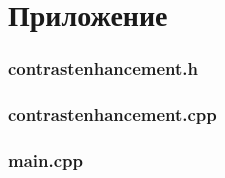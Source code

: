 \section*{Приложение}\label{prog}

\vspace{5mm}

\subsubsection*{contrast\textunderscore enhancement.h}


\vspace{1cm}

\subsubsection*{contrast\textunderscore enhancement.cpp}


\vspace{1cm}

\subsubsection*{main.cpp}


